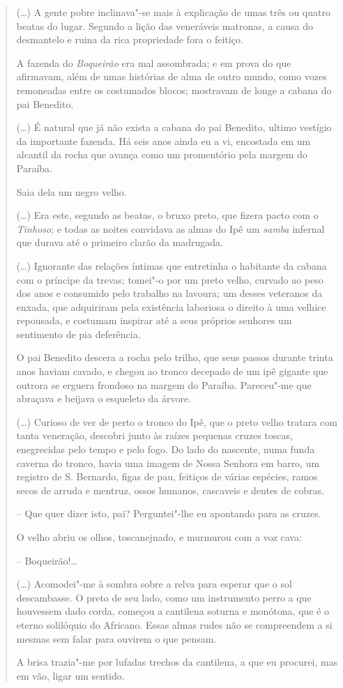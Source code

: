 \begin{quote}
(\ldots{}) A gente pobre inclinava"-se mais à explicação de umas três ou
quatro beatas do lugar. Segundo a lição das veneráveis matronas, a causa
do desmantelo e ruina da rica propriedade fora o feitiço.

A fazenda do \emph{Boqueirão} era mal assombrada; e em prova do que afirmavam, além
de umas histórias de alma de outro mundo, como vozes remoneadas entre os
costumados blocos; mostravam de longe a cabana do pai Benedito.

(\ldots{}) É natural que já não exista a cabana do pai Benedito, ultimo vestígio da
importante fazenda. Há seis anos ainda eu a vi, encostada em um alcantil
da rocha que avança como um promentório pela margem do Paraíba.

Saia dela um negro velho.

(\ldots{}) Era este, segundo as beatas, o bruxo preto,
que fizera pacto com o \emph{Tinhoso}; e todas as noites convidava as
almas do Ipê um \emph{samba} infernal que durava até o primeiro clarão
da madrugada.

(\ldots{}) Ignorante das relações íntimas que entretinha o
habitante da cabana com o príncipe da trevas; tomei"-o por um preto
velho, curvado ao peso dos anos e consumido pelo trabalho na lavoura; um
desses veteranos da enxada, que adquiriram pela existência laboriosa o
direito à uma velhice repousada, e costumam inspirar até a seus próprios
senhores um sentimento de pia deferência.

O pai Benedito descera a rocha pelo trilho, que seus passos durante trinta anos haviam cavado, e chegou ao tronco decepado de um ipê gigante que outrora se erguera
frondoso na margem do Paraíba. Pareceu"-me que abraçava e beijava o
esqueleto da árvore.

(\ldots{}) Curioso de ver de perto o tronco do Ipê,
que o preto velho tratara com tanta veneração, descobri junto às raízes
pequenas cruzes toscas, enegrecidas pelo tempo e pelo fogo. Do lado do
nascente, numa funda caverna do tronco, havia uma imagem de Nossa
Senhora em barro, um registro de S. Bernardo, figas de pau, feitiços de
várias espécies, ramos secos de arruda e mentruz, ossos humanos,
cascaveis e dentes de cobras.

-- Que quer dizer isto, pai? Perguntei"-lhe eu apontando para as cruzes.

O velho abriu os olhos, toscanejnado, e murmurou com a voz cava:

-- Boqueirão!\ldots{}

(\ldots{}) Acomodei"-me à sombra sobre a relva para esperar que o sol descambasse. O
preto de seu lado, como um instrumento perro a que houvessem dado corda,
começou a cantilena soturna e monótona, que é o eterno solilóquio do
Africano. Essas almas rudes não se compreendem a si mesmas sem falar
para ouvirem o que pensam. 

A brisa trazia"-me por lufadas trechos da cantilena, a que eu procurei, mas em vão, ligar um sentido.
\end{quote}

